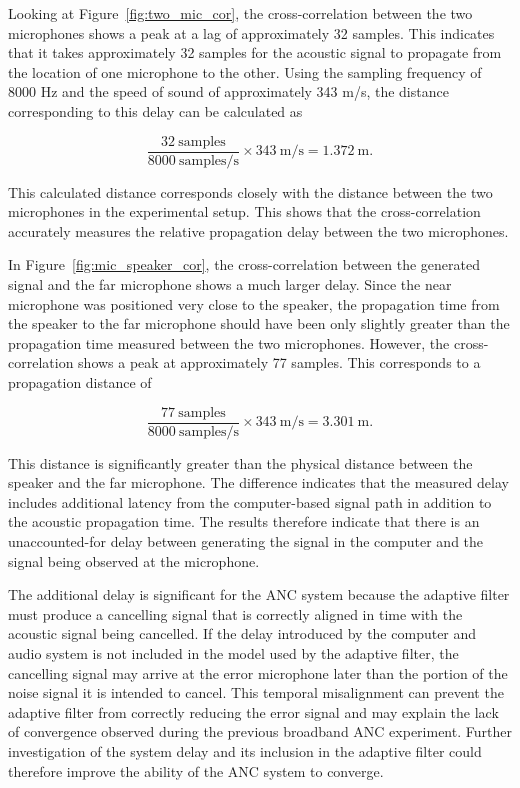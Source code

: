 Looking at Figure~\ref{fig:two_mic_cor}, the cross-correlation between the two microphones shows a peak at a lag of approximately 32 samples. This indicates that it takes approximately 32 samples for the acoustic signal to propagate from the location of one microphone to the other. Using the sampling frequency of 8000 Hz and the speed of sound of approximately 343 m/s, the distance corresponding to this delay can be calculated as

\[
\frac{32\ \text{samples}}{8000\ \text{samples/s}}
\times 343\ \text{m/s}
= 1.372\ \text{m}.
\]

This calculated distance corresponds closely with the distance between the two microphones in the experimental setup. This shows that the cross-correlation accurately measures the relative propagation delay between the two microphones.

In Figure~\ref{fig:mic_speaker_cor}, the cross-correlation between the generated signal and the far microphone shows a much larger delay. Since the near microphone was positioned very close to the speaker, the propagation time from the speaker to the far microphone should have been only slightly greater than the propagation time measured between the two microphones. However, the cross-correlation shows a peak at approximately 77 samples. This corresponds to a propagation distance of

\[
\frac{77\ \text{samples}}{8000\ \text{samples/s}}
\times 343\ \text{m/s}
= 3.301\ \text{m}.
\]

This distance is significantly greater than the physical distance between the speaker and the far microphone. The difference indicates that the measured delay includes additional latency from the computer-based signal path in addition to the acoustic propagation time. The results therefore indicate that there is an unaccounted-for delay between generating the signal in the computer and the signal being observed at the microphone.

The additional delay is significant for the ANC system because the adaptive filter must produce a cancelling signal that is correctly aligned in time with the acoustic signal being cancelled. If the delay introduced by the computer and audio system is not included in the model used by the adaptive filter, the cancelling signal may arrive at the error microphone later than the portion of the noise signal it is intended to cancel. This temporal misalignment can prevent the adaptive filter from correctly reducing the error signal and may explain the lack of convergence observed during the previous broadband ANC experiment. Further investigation of the system delay and its inclusion in the adaptive filter could therefore improve the ability of the ANC system to converge. 


